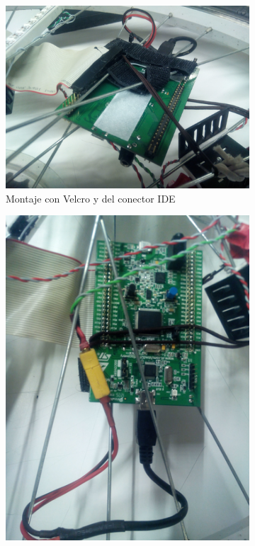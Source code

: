 \begin{figure}[!ht]
	\begin{subfigure}[t]{0.3\textwidth}
		\centering
		\includegraphics[width=\textwidth]{images/montajePlaca-velcro}
		\caption{Montaje con Velcro y del conector IDE}
		\label{fig:montajePlaca-velcro}
	\end{subfigure}
	\hspace{0.5cm}
	\begin{subfigure}[t]{0.3\textwidth}
		\centering
		\includegraphics[width=\textwidth]{images/montajePlaca-alimentacion}

\end{subfigure}
\end{figure}
